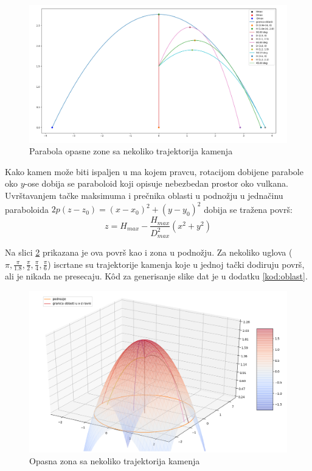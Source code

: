 \documentclass[a4paper]{article}
\begin{document}
\begin{figure}[h!]
\begin{center}
\includegraphics[width=\textwidth]{2D_parabola_vise.png}
\end{center}
\caption{Parabola opasne zone sa nekoliko trajektorija kamenja}
\label{fig:parabola}
\end{figure}

Kako kamen može biti ispaljen u ma kojem pravcu, rotacijom dobijene parabole oko
$y$-ose dobija se paraboloid koji opisuje nebezbedan prostor oko vulkana.
Uvrštavanjem tačke maksimuma i prečnika oblasti u podnožju u jednačinu paraboloida
$ 2p(z-z_0) = (x-x_0)^2 + (y-y_0)^2 $ dobija se tražena površ:
\begin{equation}
\label{eq:paraboloid}
\boxed{z = H_{max} - \frac{H_{max}}{D^2_{max}} (x^2 + y^2)}
\end{equation}

Na slici \ref{fig:paraboloid} prikazana je ova površ kao i zona u podnožju.
Za nekoliko uglova ($\pi, \frac{\pi}{1.8}, \frac{\pi}{2}, \frac{\pi}{4}, 
\frac{\pi}{6} $) iscrtane su trajektorije kamenja koje u jednoj tački dodiruju
površ, ali je nikada ne presecaju. K\^{o}d za generisanje slike dat je u dodatku
\ref{kod:oblast}.\\

\begin{figure}[h!]
\begin{center}
\includegraphics[width=\textwidth]{opasna_oblast.png}
\end{center}
\caption{Opasna zona sa nekoliko trajektorija kamenja}
\label{fig:paraboloid}
\end{figure}
\end{document}
